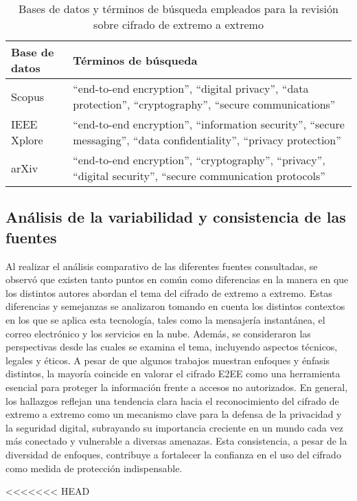 \documentclass[spanish,12pt,a4paper]{article}
\begin{document}
	\begin{table}[ht]
		\centering
		\caption{Bases de datos y términos de búsqueda empleados para la revisión sobre cifrado de extremo a extremo}
		\label{tab:busqueda}
		\vspace{0.5cm}
		\begin{tabularx}{\textwidth}{l X}
			\hline
			\textbf{Base de datos} & \textbf{Términos de búsqueda} \\
			\hline
			Scopus & “end-to-end encryption”, “digital privacy”, “data protection”, “cryptography”, “secure communications” \\
			\hline
			IEEE Xplore & “end-to-end encryption”, “information security”, “secure messaging”, “data confidentiality”, “privacy protection” \\
			\hline
			arXiv & “end-to-end encryption”, “cryptography”, “privacy”, “digital security”, “secure communication protocols” \\
			\hline
		\end{tabularx}
	\end{table}
	
	
		
	\begin{multicols}{2}
		
		\subsection*{\normalsize Análisis de la variabilidad y consistencia de las fuentes }
		
		Al realizar el análisis comparativo de las diferentes fuentes consultadas, se observó que existen tanto puntos en común como diferencias en la manera en que los distintos autores abordan el tema del cifrado de extremo a extremo. Estas diferencias y semejanzas se analizaron tomando en cuenta los distintos contextos en los que se aplica esta tecnología, tales como la mensajería instantánea, el correo electrónico y los servicios en la nube. Además, se consideraron las perspectivas desde las cuales se examina el tema, incluyendo aspectos técnicos, legales y éticos. A pesar de que algunos trabajos muestran enfoques y énfasis distintos, la mayoría coincide en valorar el cifrado E2EE como una herramienta esencial para proteger la información frente a accesos no autorizados. En general, los hallazgos reflejan una tendencia clara hacia el reconocimiento del cifrado de extremo a extremo como un mecanismo clave para la defensa de la privacidad y la seguridad digital, subrayando su importancia creciente en un mundo cada vez más conectado y vulnerable a diversas amenazas. Esta consistencia, a pesar de la diversidad de enfoques, contribuye a fortalecer la confianza en el uso del cifrado como medida de protección indispensable.
	\end{multicols}
<<<<<<< HEAD
\end{document}
